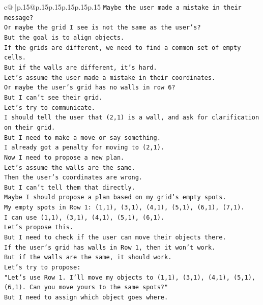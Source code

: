 \documentclass{article}
\begin{document}
{\begin{supertabular}{c@{$\;$}|p{.15\linewidth}@{}p{.15\linewidth}p{.15\linewidth}p{.15\linewidth}p{.15\linewidth}p{.15\linewidth}}
{{{\texttt{Maybe the user made a mistake in their message?} \\
\texttt{Or maybe the grid I see is not the same as the user's?} \\
\texttt{But the goal is to align objects.} \\
\texttt{If the grids are different, we need to find a common set of empty cells.} \\
\texttt{But if the walls are different, it's hard.} \\
\texttt{Let's assume the user made a mistake in their coordinates.} \\
\texttt{Or maybe the user's grid has no walls in row 6?} \\
\texttt{But I can't see their grid.} \\
\texttt{Let's try to communicate.} \\
\texttt{I should tell the user that (2,1) is a wall, and ask for clarification on their grid.} \\
\texttt{But I need to make a move or say something.} \\
\texttt{I already got a penalty for moving to (2,1).} \\
\texttt{Now I need to propose a new plan.} \\
\texttt{Let's assume the walls are the same.} \\
\texttt{Then the user's coordinates are wrong.} \\
\texttt{But I can't tell them that directly.} \\
\texttt{Maybe I should propose a plan based on my grid's empty spots.} \\
\texttt{My empty spots in Row 1: (1,1), (3,1), (4,1), (5,1), (6,1), (7,1).} \\
\texttt{I can use (1,1), (3,1), (4,1), (5,1), (6,1).} \\
\texttt{Let's propose this.} \\
\texttt{But I need to check if the user can move their objects there.} \\
\texttt{If the user's grid has walls in Row 1, then it won't work.} \\
\texttt{But if the walls are the same, it should work.} \\
\texttt{Let's try to propose:} \\
\texttt{"Let's use Row 1. I'll move my objects to (1,1), (3,1), (4,1), (5,1), (6,1). Can you move yours to the same spots?"} \\
\texttt{But I need to assign which object goes where.} \\
}}}
\end{supertabular}}
\end{document}
